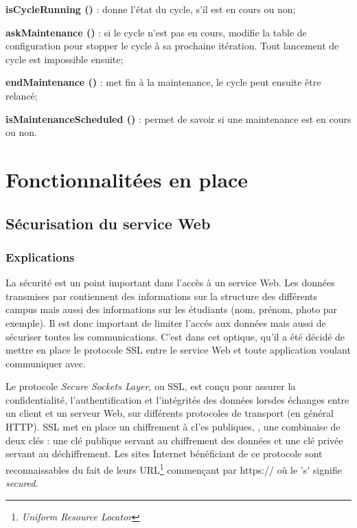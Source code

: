 \noindent\textbf{isCycleRunning ()} : donne l'\'etat du cycle, s'il est en cours ou non;

\noindent\textbf{askMaintenance ()} : si le cycle n'est pas en cours, modifie la table de configuration pour stopper le cycle \`a sa prochaine it\'eration.
Tout lancement de cycle est impossible ensuite;

\noindent\textbf{endMaintenance ()} : met fin \`a la maintenance, le cycle peut ensuite \^etre relanc\'e;

\noindent\textbf{isMaintenanceScheduled ()} : permet de savoir si une maintenance est en cours ou non.


\section{Fonctionnalit\'ees en place}

\subsection{S\'ecurisation du service Web}
\label{section:securisation}

\subsubsection{Explications}

La s\'ecurit\'e est un point important dans l'acc\`es \`a un service Web. 
Les donn\'ees transmises par \YuukouII{} contiennent des informations sur la structure des diff\'erents campus mais aussi des informations sur les \'etudiants (nom, pr\'enom, photo par exemple).
Il est donc important de limiter l'acc\'es aux donn\'ees mais aussi de s\'ecuriser toutes les communications.
C'est dans cet optique, qu'il a \'et\'e d\'ecid\'e de mettre en place le protocole SSL entre le service Web et toute application voulant communiquer avec.

Le protocole \textit{Secure Sockets Layer}, ou SSL, est con\c{c}u pour assurer la confidentialit\'e, l'authentification et l'int\'egrit\'es des donn\'ees lorsdes \'echanges entre un client et un serveur Web, sur diff\'erents protocoles de transport (en g\'en\'eral HTTP).
SSL met en place un chiffrement \`a cl'es publiques, \cad, une combinaise de deux cl\'es : une cl\'e publique servant au chiffrement des donn\'ees et une cl\'e priv\'ee servant au d\'echiffrement.
Les sites Internet b\'en\'eficiant de ce protocole sont reconnaissables du fait de leurs URL\protect\footnote{\textit{Uniform Resource Locator}} commen\c{c}ant par \textsf{https://} o\`u le 's' signifie \textit{secured}.

